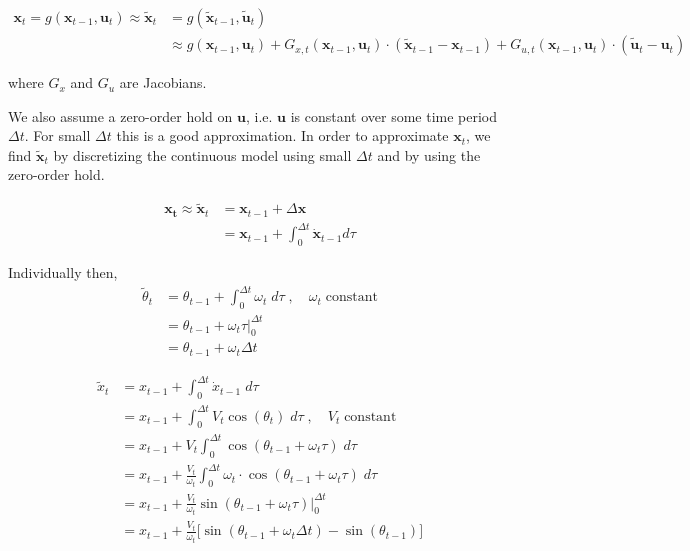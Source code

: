 \documentclass{article}
\begin{document}
\begin{enumerate}[label=(\roman*)]
\begin{equation}
\begin{aligned}
\mathbf{x}_t = g(\mathbf{x}_{t-1}, \mathbf{u}_t) \approx \tilde{\mathbf{x}}_t &= g(\tilde{\mathbf{x}}_{t-1}, \tilde{\mathbf{u}}_t) \\
&\approx g(\mathbf{x}_{t-1}, \mathbf{u}_t)
+ G_{x,t}(\mathbf{x}_{t-1}, \mathbf{u}_t)\cdot (\tilde{\mathbf{x}}_{t-1} - \mathbf{x}_{t-1})
+ G_{u,t}(\mathbf{x}_{t-1}, \mathbf{u}_t)\cdot (\tilde{\mathbf{u}}_t - \mathbf{u}_t)
\end{aligned}
\end{equation}

where $G_x$ and $G_u$ are Jacobians.

We also assume a zero-order hold on $\mathbf u$, i.e. $\mathbf{u}$ is constant over some time period $\Delta t$. For small $\Delta t$ this is a good approximation. In order to approximate $\mathbf{x}_t$, we find $\tilde{\mathbf{x}}_t$ by discretizing the continuous model using small $\Delta t$ and by using the zero-order hold.

\begin{equation}
\begin{aligned}
\mathbf{x_t} \approx \tilde{\mathbf{x}}_t &= \mathbf{x}_{t-1} + \Delta \mathbf{x} \\
&= \mathbf{x}_{t-1} + \int_0^{\Delta t} \mathbf{\dot x}_{t-1} d\tau
\end{aligned}
\end{equation}

Individually then,
\begin{equation}
\begin{aligned}
\tilde \theta_t &= \theta_{t-1} + \int_0^{\Delta t} \omega_t \; d\tau \;,\quad \omega_t \; \text{constant} \\
&= \theta_{t-1} + \omega_t \tau \big\rvert_0^{\Delta t} \\
&= \theta_{t-1} + \omega_t \Delta t
\end{aligned}
\end{equation}

\begin{equation}
\begin{aligned}
\tilde x_t &= x_{t-1} + \int_0^{\Delta t} \dot{x}_{t-1} \; d\tau \\
&= x_{t-1} + \int_0^{\Delta t} V_t \cos(\theta_t) \; d\tau \;,\quad V_t \; \text{constant} \\
&= x_{t-1} + V_t \int_0^{\Delta t} \cos(\theta_{t-1} + \omega_t\tau) \; d\tau \\
&= x_{t-1} + \frac{V_t}{\omega_t} \int_0^{\Delta t} \omega_t \cdot \cos(\theta_{t-1} + \omega_t\tau) \; d\tau \\
&= x_{t-1} + \frac{V_t}{\omega_t} \sin(\theta_{t-1} + \omega_t\tau) \Big\rvert_0^{\Delta t} \\
&= x_{t-1} + \frac{V_t}{\omega_t} \Big[ \sin(\theta_{t-1} + \omega_t\Delta t) - \sin(\theta_{t-1}) \Big]
\end{aligned}
\end{equation}


\end{enumerate}
\end{document}

